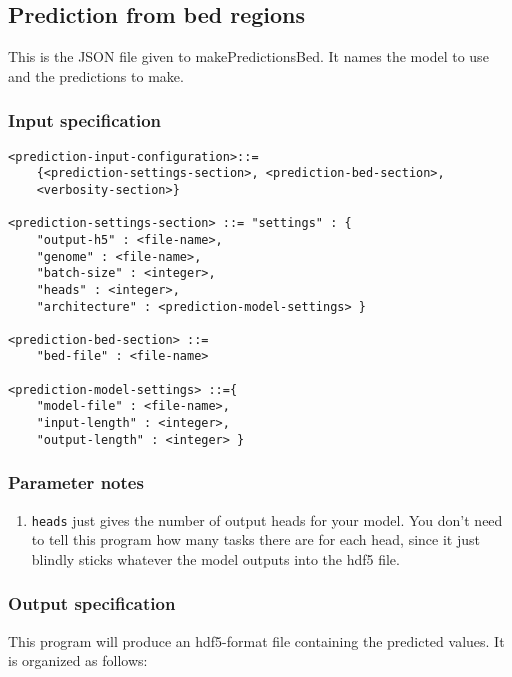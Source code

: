 \documentclass{article}
\begin{document}
\subsection{Prediction from bed regions}

This is the JSON file given to makePredictionsBed. It names the model to use and the predictions to make. 

\subsubsection{Input specification}

\begin{lstlisting}
<prediction-input-configuration>::=
    {<prediction-settings-section>, <prediction-bed-section>,
    <verbosity-section>}

<prediction-settings-section> ::= "settings" : {
    "output-h5" : <file-name>,
    "genome" : <file-name>,
    "batch-size" : <integer>,
    "heads" : <integer>,
    "architecture" : <prediction-model-settings> }

<prediction-bed-section> ::=
    "bed-file" : <file-name>

<prediction-model-settings> ::={
    "model-file" : <file-name>,
    "input-length" : <integer>,
    "output-length" : <integer> }
\end{lstlisting}

\subsubsection{Parameter notes}

\begin{enumerate}
    \item \texttt{heads} just gives the number of output heads for your model. You don't need to tell this program how many tasks there are for each head, since it just blindly sticks whatever the model outputs into the hdf5 file. 
\end{enumerate}

\subsubsection{Output specification}

This program will produce an hdf5-format file containing the predicted values. It is organized as follows:
\end{document}
